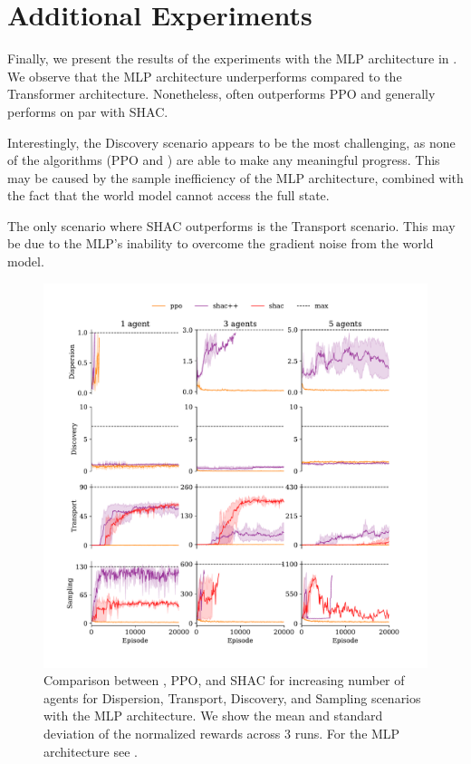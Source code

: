 \section{Additional Experiments}

Finally, we present the results of the experiments with the MLP architecture in . We observe that the MLP architecture underperforms compared to the Transformer architecture. Nonetheless, \fname{} often outperforms PPO and generally performs on par with SHAC.

Interestingly, the Discovery scenario appears to be the most challenging, as none of the algorithms (PPO and \fname{}) are able to make any meaningful progress. This may be caused by the sample inefficiency of the MLP architecture, combined with the fact that the world model cannot access the full state.

The only scenario where SHAC outperforms \fname{} is the Transport scenario. This may be due to the MLP's inability to overcome the gradient noise from the world model.

\begin{figure}[t]
    \centering
    \includegraphics[width=\columnwidth]{figs/main-mlp.pdf}
    \caption{Comparison between \fname{}, PPO, and SHAC for increasing number of agents for Dispersion, Transport, Discovery, and Sampling scenarios with the MLP architecture.
    We show the mean and standard deviation of the normalized rewards across $3$ runs. For the MLP architecture see .
    }\vspace{0.5cm}
    \label{apx:fig:experiments-mlp}

\end{figure}


